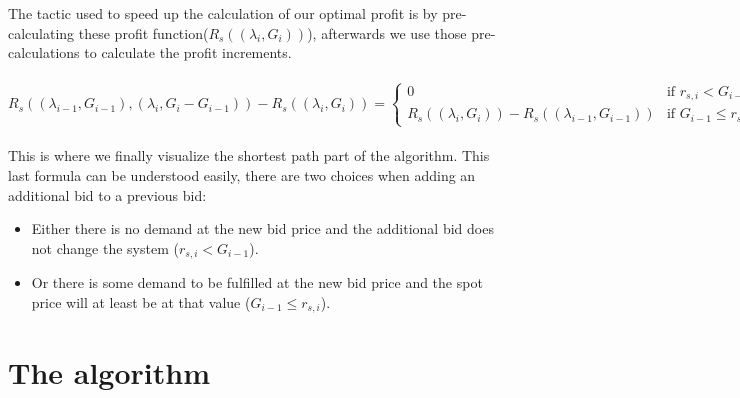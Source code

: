 \documentclass[letterpaper]{article}
\begin{document}
The tactic used to speed up the calculation of our optimal profit is by pre-calculating these profit function($R_s((\lambda_i, G_i))$), afterwards we use those pre-calculations to calculate the profit increments.\\ \\
\(\displaystyle R_s\left( (\lambda_{i-1}, G_{i-1}), (\lambda_i, G_i - G_{i-1}) \right) -
R_s((\lambda_i, G_i)) = \left\{
	\begin{array}{cl}
	0 & \mbox{if } r_{s,i} < G_{i-1}, \\
	R_s((\lambda_i, G_i)) - R_s((\lambda_{i-1}, G_{i-1})) & \mbox{if } G_{i-1} \le r_{s,i}.
	\end{array}
\right. \)\\ \\
This is where we finally visualize the shortest path part of the algorithm. This last formula can be understood easily, there are two choices when adding an additional bid to a previous bid:\\
\begin{itemize}
\item Either there is no demand at the new bid price and the additional bid does not change the system ($r_{s,i} < G_{i-1}$).
\item Or there is some demand to be fulfilled at the new bid price and the spot price will at least be at that value ($G_{i-1} \le r_{s,i}$).
\end{itemize}
\section{The algorithm}
\end{document}

